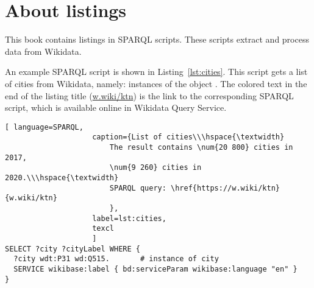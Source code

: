 
\section{About listings}

This book contains listings in SPARQL scripts.
These scripts extract and process data from Wikidata.%

An example SPARQL script is shown in Listing~\ref{lst:cities}. 
This script gets a list of cities from Wikidata, 
namely: instances of the object .
The colored text in the end of the listing title 
(\href{https://w.wiki/ktn}{w.wiki/ktn}) 
is the link to the corresponding SPARQL script,  
which is available online in Wikidata Query Service. 



\begin{lstlisting}[ language=SPARQL, 
                    caption={List of cities\\\hspace{\textwidth}
                        The result contains \num{20 800} cities in 2017, 
                        \num{9 260} cities in 2020.\\\hspace{\textwidth}
                        SPARQL query: \href{https://w.wiki/ktn}{w.wiki/ktn}
                        },
                    label=lst:cities,
                    texcl 
                    ]
SELECT ?city ?cityLabel WHERE { 
  ?city wdt:P31 wd:Q515.       # instance of city 
  SERVICE wikibase:label { bd:serviceParam wikibase:language "en" }
}
\end{lstlisting}%



